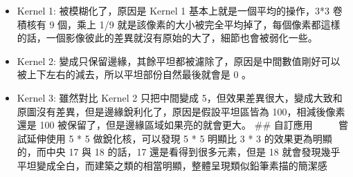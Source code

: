 \documentclass[11pt]{article}
\providecommand{\tightlist}{%
      \setlength{\itemsep}{0pt}\setlength{\parskip}{0pt}}
\begin{document}
\begin{itemize}
\tightlist
\item
  Kernel 1: 被模糊化了，原因是 Kernel 1 基本上就是一個平均的操作，3*3
  卷積核有 9 個，乘上 1/9
  就是該像素的大小被完全平均掉了，每個像素都這樣的話，一個影像彼此的差異就沒有原始的大了，細節也會被弱化一些。
\item
  Kernel 2:
  變成只保留邊緣，其餘平坦都被濾除了，原因是中間數值剛好可以被上下左右的減去，所以平坦部份自然最後就會是
  0 。
\item
  Kernel 3: 雖然對比 Kernel 2 只把中間變成
  5，但效果差異很大，變成大致和原圖沒有差異，但是邊緣銳利化了，原因是假設平坦區皆為
  100，相減後像素還是 100 被保留了，但是邊緣區域如果亮的就會更大。 \#\#
  自訂應用 \(\qquad\) 嘗試延伸使用 5 * 5 做銳化核，可以發現 5 * 5 明顯比
  3 * 3 的效果更為明顯的，而中央 17 與 18 的話，17
  還是看得到很多元素，但是 18
  就會發現幾乎平坦變成全白，而建築之類的相當明顯，整體呈現類似鉛筆素描的簡潔感
\end{itemize}
\end{document}
